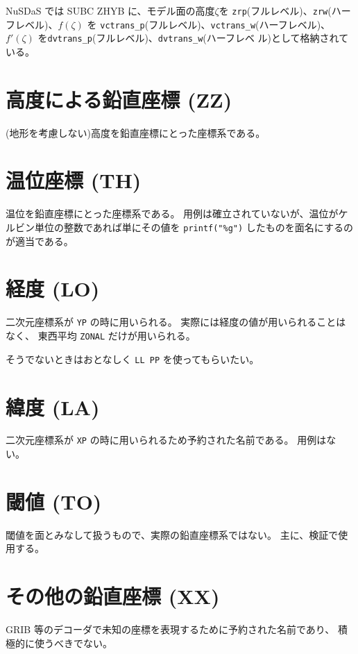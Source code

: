 NuSDaS では SUBC ZHYB に、モデル面の高度$\zeta$を
{\tt zrp}(フルレベル)、{\tt zrw}(ハーフレベル)、$f(\zeta)$ を \newline
{\tt vctrans\_p}(フルレベル)、{\tt vctrans\_w}(ハーフレベル)、
$f'(\zeta)$ を{\tt dvtrans\_p}(フルレベル)、{\tt dvtrans\_w}(ハーフレベ
ル)として格納されている。
\section{高度による鉛直座標 (ZZ)}
(地形を考慮しない)高度を鉛直座標にとった座標系である。

\section{温位座標 (TH)}
温位を鉛直座標にとった座標系である。
用例は確立されていないが、温位がケルビン単位の整数であれば単にその値を
\verb|printf("%g")| したものを面名にするのが適当である。

\section{経度 (LO)}

二次元座標系が {\tt YP} の時に用いられる。
実際には経度の値が用いられることはなく、
東西平均 {\tt ZONAL} だけが用いられる。

そうでないときはおとなしく {\tt LL PP} を使ってもらいたい。

\section{緯度 (LA)}

二次元座標系が {\tt XP} の時に用いられるため予約された名前である。
用例はない。

\section{閾値 (TO)}
閾値を面とみなして扱うもので、実際の鉛直座標系ではない。
主に、検証で使用する。

\section{その他の鉛直座標 (XX)}

GRIB 等のデコーダで未知の座標を表現するために予約された名前であり、
積極的に使うべきでない。
